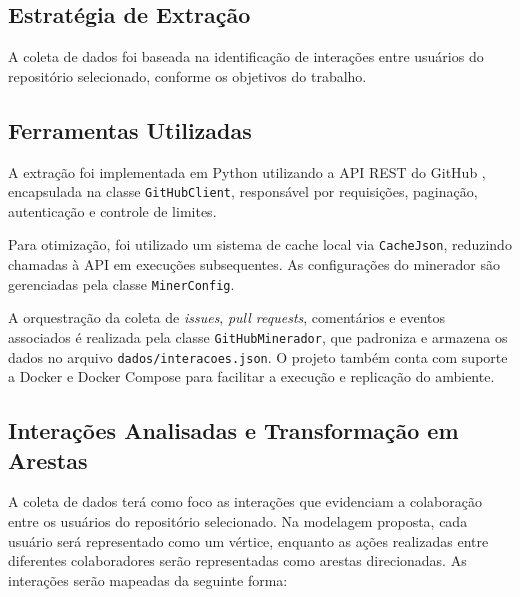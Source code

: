 \documentclass[12pt]{article}
\begin{document}
\subsection{Estratégia de Extração}

A coleta de dados foi baseada na identificação de interações entre usuários do repositório selecionado, conforme os objetivos do trabalho.

\subsection{Ferramentas Utilizadas}

A extração foi implementada em Python utilizando a API REST do GitHub \cite{githubREST}, encapsulada na classe \texttt{GitHubClient}, responsável por requisições, paginação, autenticação e controle de limites.

Para otimização, foi utilizado um sistema de cache local via \texttt{CacheJson}, reduzindo chamadas à API em execuções subsequentes. As configurações do minerador são gerenciadas pela classe \texttt{MinerConfig}.

A orquestração da coleta de \textit{issues}, \textit{pull requests}, comentários e eventos associados é realizada pela classe \texttt{GitHubMinerador}, que padroniza e armazena os dados no arquivo \texttt{dados/interacoes.json}. O projeto também conta com suporte a Docker e Docker Compose para facilitar a execução e replicação do ambiente.


\subsection{Interações Analisadas e Transformação em Arestas}

A coleta de dados terá como foco as interações que evidenciam a colaboração entre os usuários do repositório selecionado. Na modelagem proposta, cada usuário será representado como um vértice, enquanto as ações realizadas entre diferentes colaboradores serão representadas como arestas direcionadas. As interações serão mapeadas da seguinte forma:
\end{document}
